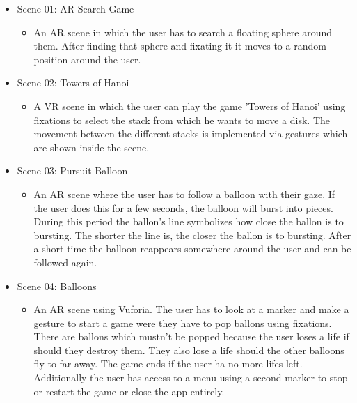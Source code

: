 \documentclass[../../Instructions_Framework]{subfiles}
\begin{document}
\begin{itemize}
	\item Scene 01: AR Search Game
	\begin{itemize}
		\item An AR scene in which the user has to search a floating sphere around them. After finding that sphere and fixating it it moves to a random position around the user.
	\end{itemize}
	\item Scene 02: Towers of Hanoi
	\begin{itemize}
		\item A VR scene in which the user can play the game 'Towers of Hanoi' using fixations to select the stack from which he wants to move a disk. The movement between the different stacks is implemented via gestures which are shown inside the scene.
	\end{itemize}
	\item Scene 03: Pursuit Balloon
	\begin{itemize}
		\item An AR scene where the user has to follow a balloon with their gaze. If the user does this for a few seconds, the balloon will burst into pieces. During this period the ballon's line symbolizes how close the ballon is to bursting. The shorter the line is, the closer the ballon is to bursting. After a short time the balloon reappears somewhere around the user and can be followed again.
	\end{itemize}
	\item Scene 04: Balloons
	\begin{itemize}
		\item An AR scene using Vuforia. The user has to look at a marker and make a gesture to start a game were they have to pop ballons using fixations. There are ballons which mustn't be popped because the user loses a life if should they destroy them. They also lose a life should the other balloons fly to far away. The game ends if the user ha no more lifes left. Additionally the user has access to a menu using a second marker to stop or restart the game or close the app entirely.
	\end{itemize}
\end{itemize}
\end{document}
